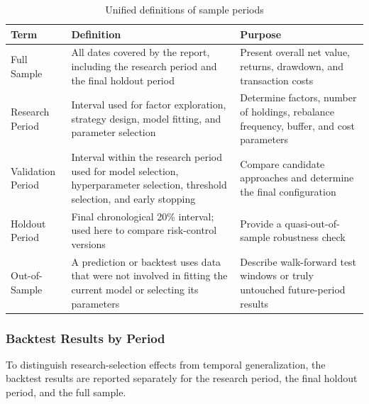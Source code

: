 \documentclass[a4paper,11pt,openany]{report}
\begin{document}
\begin{table}[H]
\centering
\caption{Unified definitions of sample periods}
\small
\begin{tabularx}{\textwidth}{
    >{\raggedright\arraybackslash}p{3.2cm}
    >{\raggedright\arraybackslash}X
    >{\raggedright\arraybackslash}X
}
\toprule
Term & Definition & Purpose \\
\midrule
Full Sample
& All dates covered by the report, including the research period and the final holdout period
& Present overall net value, returns, drawdown, and transaction costs \\

Research Period
& Interval used for factor exploration, strategy design, model fitting, and parameter selection
& Determine factors, number of holdings, rebalance frequency, buffer, and cost parameters \\

Validation Period
& Interval within the research period used for model selection, hyperparameter selection, threshold selection, and early stopping
& Compare candidate approaches and determine the final configuration \\

Holdout Period
& Final chronological 20\% interval; used here to compare risk-control versions
& Provide a quasi-out-of-sample robustness check \\

Out-of-Sample
& A prediction or backtest uses data that were not involved in fitting the current model or selecting its parameters
& Describe walk-forward test windows or truly untouched future-period results \\
\bottomrule
\end{tabularx}
\end{table}

\subsubsection{Backtest Results by Period}

To distinguish research-selection effects from temporal generalization, the backtest results are reported separately for the research period, the final holdout period, and the full sample.
\end{document}
